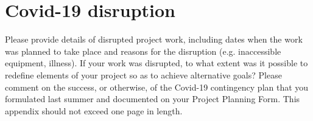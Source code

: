 \section{Covid-19 disruption}

Please provide details of disrupted project work, including dates when the work was planned to take place and
reasons for the disruption (e.g. inaccessible equipment, illness).
If your work was disrupted, to what extent was it possible to redefine elements of your project so as to achieve
alternative goals? Please comment on the success, or otherwise, of the Covid-19 contingency plan that you
formulated last summer and documented on your Project Planning Form.
This appendix should not exceed one page in length.